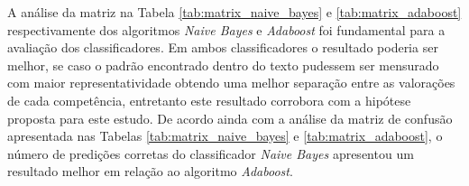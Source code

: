 A análise da matriz na Tabela 
\ref{tab:matrix_naive_bayes} e \ref{tab:matrix_adaboost} respectivamente dos 
algoritmos \textit{Naive Bayes} e \textit{Adaboost} foi fundamental para a
avaliação dos classificadores. Em ambos classificadores o resultado poderia ser 
melhor, se caso o padrão encontrado dentro do texto pudessem ser mensurado com 
maior representatividade obtendo uma melhor separação entre as valorações de 
cada competência, entretanto este resultado corrobora com a hipótese proposta 
para este estudo. De acordo ainda com a análise da matriz de confusão 
apresentada nas Tabelas \ref{tab:matrix_naive_bayes} e 
\ref{tab:matrix_adaboost}, o número de predições corretas do classificador 
\textit{Naive Bayes} apresentou um resultado melhor em relação 
ao algoritmo \textit{Adaboost}. 
